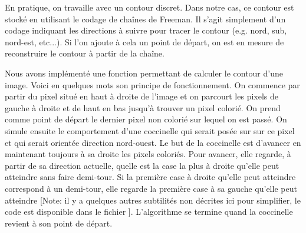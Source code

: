 En pratique, on travaille avec un contour discret. 
Dans notre cas, ce contour est stocké en utilisant le codage 
de chaînes de Freeman.
Il s'agit simplement d'un codage indiquant les directions à suivre 
pour tracer le contour (e.g.\/ nord, sub, nord-est, etc...).
Si l'on ajoute à cela un point de départ, on est en mesure de 
reconstruire le contour à partir de la chaîne.


Nous avons implémenté une fonction permettant de calculer le 
contour d'une image.
Voici en quelques mots son principe de fonctionnement. 
On commence par partir du pixel situé en haut à droite de l'image 
et on parcourt les pixels de gauche à droite et de haut en bas 
jusqu'à trouver un pixel colorié. 
On prend comme point de départ le dernier pixel non colorié sur lequel 
on est passé.
On simule ensuite le comportement d'une coccinelle qui serait posée sur 
sur ce pixel et qui serait orientée direction nord-ouest. 
Le but de la coccinelle est d'avancer en maintenant toujours à sa 
droite les pixels coloriés. 
Pour avancer, elle regarde, à partir de sa direction actuelle, quelle 
est la case la plus à droite qu'elle peut atteindre sans faire demi-tour.
Si la première case à droite qu'elle peut atteindre correspond à un demi-tour, 
elle regarde la première case à sa gauche qu'elle peut atteindre
[Note: il y a quelques autres subtilités non décrites ici pour simplifier, 
le code est disponible dans le fichier ].
L'algorithme se termine quand la coccinelle revient à son point de départ.

